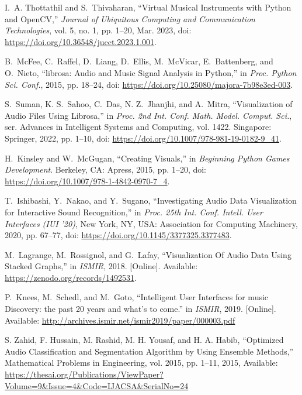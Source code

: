 \documentclass{article}
\begin{document}
\begin{thebibliography}{citations}
I.~A. Thottathil and S.~Thivaharan, ``Virtual Musical Instruments with Python and OpenCV,'' \emph{Journal of Ubiquitous Computing and Communication Technologies}, vol. 5, no. 1, pp. 1–20, Mar. 2023, doi: \url{https://doi.org/10.36548/jucct.2023.1.001}.

B.~McFee, C.~Raffel, D.~Liang, D.~Ellis, M.~McVicar, E.~Battenberg, and O.~Nieto, ``librosa: Audio and Music Signal Analysis in Python,'' in \emph{Proc. Python Sci. Conf.}, 2015, pp. 18–24, doi: \url{https://doi.org/10.25080/majora-7b98e3ed-003}.

S.~Suman, K. S.~Sahoo, C.~Das, N. Z.~Jhanjhi, and A.~Mitra, ``Visualization of Audio Files Using Librosa,'' in \emph{Proc. 2nd Int. Conf. Math. Model. Comput. Sci.}, ser. Advances in Intelligent Systems and Computing, vol. 1422. Singapore: Springer, 2022, pp. 1–10, doi: \url{https://doi.org/10.1007/978-981-19-0182-9_41}.

H.~Kinsley and W.~McGugan, ``Creating Visuals,'' in \emph{Beginning Python Games Development}. Berkeley, CA: Apress, 2015, pp. 1–20, doi: \url{https://doi.org/10.1007/978-1-4842-0970-7_4}.

T.~Ishibashi, Y.~Nakao, and Y.~Sugano, ``Investigating Audio Data Visualization for Interactive Sound Recognition,'' in \emph{Proc. 25th Int. Conf. Intell. User Interfaces (IUI '20)}, New York, NY, USA: Association for Computing Machinery, 2020, pp. 67–77, doi: \url{https://doi.org/10.1145/3377325.3377483}.

M.~Lagrange, M.~Rossignol, and G.~Lafay, ``Visualization Of Audio Data Using Stacked Graphs,'' in \emph{ISMIR}, 2018. [Online]. Available: \url{https://zenodo.org/records/1492531}.

P.~Knees, M.~Schedl, and M.~Goto, ``Intelligent User Interfaces for music Discovery: the past 20 years and what’s to come.'' in \emph{ISMIR}, 2019. [Online]. Available: \url{http://archives.ismir.net/ismir2019/paper/000003.pdf}

S. Zahid, F. Hussain, M. Rashid, M. H. Yousaf, and H. A. Habib, “Optimized Audio Classification and Segmentation Algorithm by Using Ensemble Methods,” Mathematical Problems in Engineering, vol. 2015, pp. 1–11, 2015, Available: \url{https://thesai.org/Publications/ViewPaper?Volume=9&Issue=4&Code=IJACSA&SerialNo=24}



\end{thebibliography}
\end{document}

